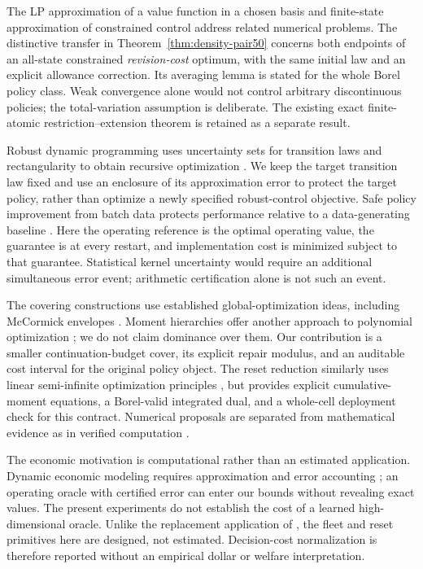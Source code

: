 The LP approximation of a value function in a chosen basis \citep{deFariasVanRoy2003} and finite-state approximation of constrained control \citep{DufourPrietoRumeau2013,Saldi2018} address related numerical problems. The distinctive transfer in Theorem~\ref{thm:density-pair50} concerns both endpoints of an all-state constrained \emph{revision-cost} optimum, with the same initial law and an explicit allowance correction. Its averaging lemma is stated for the whole Borel policy class. Weak convergence alone would not control arbitrary discontinuous policies; the total-variation assumption is deliberate. The existing exact finite-atomic restriction--extension theorem is retained as a separate result.

Robust dynamic programming uses uncertainty sets for transition laws and rectangularity to obtain recursive optimization \citep{Iyengar2005,NilimElGhaoui2005}. We keep the target transition law fixed and use an enclosure of its approximation error to protect the target policy, rather than optimize a newly specified robust-control objective. Safe policy improvement from batch data protects performance relative to a data-generating baseline \citep{Laroche2019}. Here the operating reference is the optimal operating value, the guarantee is at every restart, and implementation cost is minimized subject to that guarantee. Statistical kernel uncertainty would require an additional simultaneous error event; arithmetic certification alone is not such an event.

The covering constructions use established global-optimization ideas, including McCormick envelopes \citep{McCormick1976}. Moment hierarchies offer another approach to polynomial optimization \citep{Lasserre2001}; we do not claim dominance over them. Our contribution is a smaller continuation-budget cover, its explicit repair modulus, and an auditable cost interval for the original policy object. The reset reduction similarly uses linear semi-infinite optimization principles \citep{HettichKortanek1993}, but provides explicit cumulative-moment equations, a Borel-valid integrated dual, and a whole-cell deployment check for this contract. Numerical proposals are separated from mathematical evidence as in verified computation \citep{Rump2010}.

The economic motivation is computational rather than an estimated application. Dynamic economic modeling requires approximation and error accounting \citep{Judd1998,BrummScheidegger2017}; an operating oracle with certified error can enter our bounds without revealing exact values. The present experiments do not establish the cost of a learned high-dimensional oracle. Unlike the replacement application of \citet{Rust1987}, the fleet and reset primitives here are designed, not estimated. Decision-cost normalization is therefore reported without an empirical dollar or welfare interpretation.

